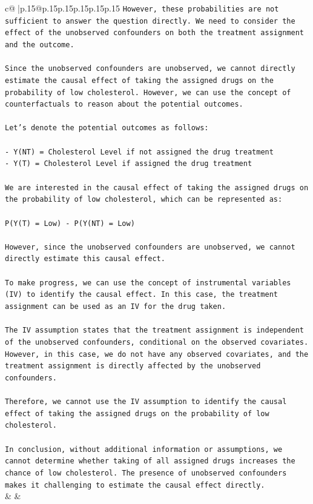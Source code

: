\documentclass{article}
\begin{document}
{\begin{supertabular}{c@{$\;$}|p{.15\linewidth}@{}p{.15\linewidth}p{.15\linewidth}p{.15\linewidth}p{.15\linewidth}p{.15\linewidth}}
{{{\texttt{However, these probabilities are not sufficient to answer the question directly. We need to consider the effect of the unobserved confounders on both the treatment assignment and the outcome.} \\
\\ 
\texttt{Since the unobserved confounders are unobserved, we cannot directly estimate the causal effect of taking the assigned drugs on the probability of low cholesterol. However, we can use the concept of counterfactuals to reason about the potential outcomes.} \\
\\ 
\texttt{Let's denote the potential outcomes as follows:} \\
\\ 
\texttt{{-} Y(NT) = Cholesterol Level if not assigned the drug treatment} \\
\texttt{{-} Y(T) = Cholesterol Level if assigned the drug treatment} \\
\\ 
\texttt{We are interested in the causal effect of taking the assigned drugs on the probability of low cholesterol, which can be represented as:} \\
\\ 
\texttt{P(Y(T) = Low) {-} P(Y(NT) = Low)} \\
\\ 
\texttt{However, since the unobserved confounders are unobserved, we cannot directly estimate this causal effect.} \\
\\ 
\texttt{To make progress, we can use the concept of instrumental variables (IV) to identify the causal effect. In this case, the treatment assignment can be used as an IV for the drug taken.} \\
\\ 
\texttt{The IV assumption states that the treatment assignment is independent of the unobserved confounders, conditional on the observed covariates. However, in this case, we do not have any observed covariates, and the treatment assignment is directly affected by the unobserved confounders.} \\
\\ 
\texttt{Therefore, we cannot use the IV assumption to identify the causal effect of taking the assigned drugs on the probability of low cholesterol.} \\
\\ 
\texttt{In conclusion, without additional information or assumptions, we cannot determine whether taking of all assigned drugs increases the chance of low cholesterol. The presence of unobserved confounders makes it challenging to estimate the causal effect directly.} \\
            }
        }
    }
    & & \\ \\


\end{supertabular}}
\end{document}
